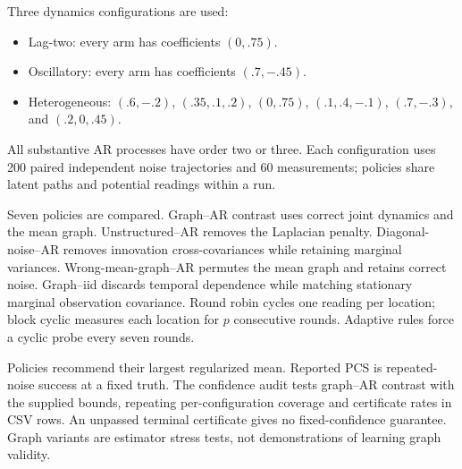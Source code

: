 Three dynamics configurations are used:
\begin{itemize}
\item Lag-two: every arm has coefficients $(0,.75)$.
\item Oscillatory: every arm has coefficients $(.7,-.45)$.
\item Heterogeneous: $(.6,-.2)$, $(.35,.1,.2)$, $(0,.75)$, $(.1,.4,-.1)$, $(.7,-.3)$, and $(.2,0,.45)$.
\end{itemize}
All substantive AR processes have order two or three. Each configuration uses 200 paired independent noise trajectories and 60 measurements; policies share latent paths and potential readings within a run.

Seven policies are compared. Graph--AR contrast uses correct joint dynamics and the mean graph. Unstructured--AR removes the Laplacian penalty. Diagonal-noise--AR removes innovation cross-covariances while retaining marginal variances. Wrong-mean-graph--AR permutes the mean graph and retains correct noise. Graph--iid discards temporal dependence while matching stationary marginal observation covariance. Round robin cycles one reading per location; block cyclic measures each location for $p$ consecutive rounds. Adaptive rules force a cyclic probe every seven rounds.

Policies recommend their largest regularized mean. Reported PCS is repeated-noise success at a fixed truth. The confidence audit tests graph--AR contrast with the supplied bounds, repeating per-configuration coverage and certificate rates in CSV rows. An unpassed terminal certificate gives no fixed-confidence guarantee. Graph variants are estimator stress tests, not demonstrations of learning graph validity.

